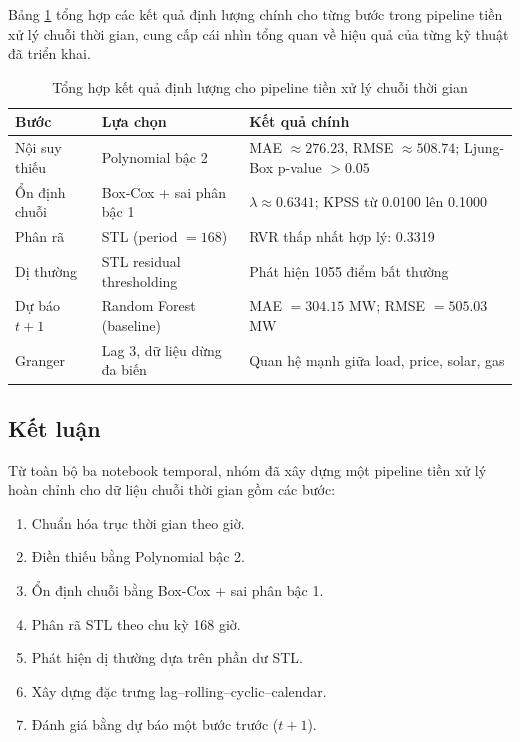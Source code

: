 Bảng \ref{tab:temporal_pipeline_summary} tổng hợp các kết quả định lượng chính cho từng bước trong pipeline tiền xử lý chuỗi thời gian, cung cấp cái nhìn tổng quan về hiệu quả của từng kỹ thuật đã triển khai.
\begin{table}[H]
    \centering
    \begin{tabular}{|p{3.2cm}|p{4.1cm}|p{5.1cm}|}
        \hline
        \textbf{Bước} & \textbf{Lựa chọn}           & \textbf{Kết quả chính}                                                 \\
        \hline
        Nội suy thiếu & Polynomial bậc 2            & MAE $\approx 276.23$, RMSE $\approx 508.74$; Ljung-Box p-value $>0.05$ \\
        \hline
        Ổn định chuỗi & Box-Cox + sai phân bậc 1    & $\lambda \approx 0.6341$; KPSS từ 0.0100 lên 0.1000                    \\
        \hline
        Phân rã       & STL (period $=168$)         & RVR thấp nhất hợp lý: 0.3319                                           \\
        \hline
        Dị thường     & STL residual thresholding   & Phát hiện 1055 điểm bất thường                                         \\
        \hline
        Dự báo $t+1$  & Random Forest (baseline)    & MAE $=304.15$ MW; RMSE $=505.03$ MW                                    \\
        \hline
        Granger       & Lag 3, dữ liệu dừng đa biến & Quan hệ mạnh giữa load, price, solar, gas                              \\
        \hline
    \end{tabular}
    \caption{Tổng hợp kết quả định lượng cho pipeline tiền xử lý chuỗi thời gian}
    \label{tab:temporal_pipeline_summary}
\end{table}

\subsection{Kết luận}
Từ toàn bộ ba notebook temporal, nhóm đã xây dựng một pipeline tiền xử lý hoàn chỉnh cho dữ liệu chuỗi thời gian gồm các bước:
\begin{enumerate}
    \item Chuẩn hóa trục thời gian theo giờ.
    \item Điền thiếu bằng Polynomial bậc 2.
    \item Ổn định chuỗi bằng Box-Cox + sai phân bậc 1.
    \item Phân rã STL theo chu kỳ 168 giờ.
    \item Phát hiện dị thường dựa trên phần dư STL.
    \item Xây dựng đặc trưng lag--rolling--cyclic--calendar.
    \item Đánh giá bằng dự báo một bước trước ($t+1$).
\end{enumerate}

